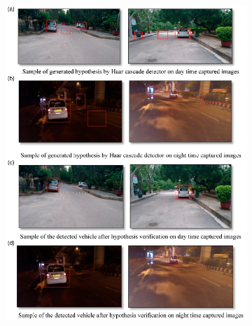 \begin{figure}[!ht]
\centering
    \begin{subfigure}{0.4\textwidth}
        \includegraphics[width=\textwidth]{img/84}\label{fig:84}
    \end{subfigure}
    \begin{subfigure}{0.4\textwidth}

\end{subfigure}
\end{figure}
